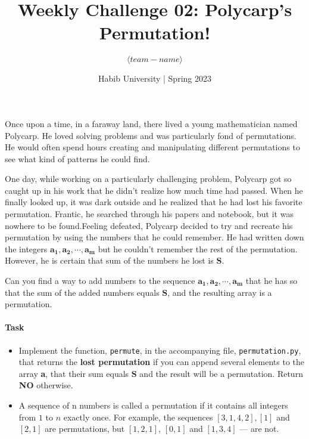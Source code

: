 \documentclass[a4paper]{exam}
\title{Weekly Challenge 02: Polycarp's Permutation!}
\author{$\langle team-name \rangle$}  %
\date{Habib University | Spring 2023}
\begin{document}
\maketitle

\begin{questions}

    Once upon a time, in a faraway land, there lived a young mathematician named Polycarp.
    He loved solving problems and was particularly fond of permutations. He would often
    spend hours creating and manipulating different permutations to see what kind of
    patterns he could find.

    One day, while working on a particularly challenging problem, Polycarp got so caught up
    in his work that he didn't realize how much time had passed. When he finally looked up,
    it was dark outside and he realized that he had lost his favorite permutation. Frantic,
    he searched through his papers and notebook, but it was nowhere to be found.Feeling
    defeated, Polycarp decided to try and recreate his permutation by using the numbers
    that he could remember. He had written down the integers $\mathbf{a_1, a_2, \cdots , a_m}$
    but he couldn't remember the rest of the permutation.  However, he is certain that
    sum of the numbers he lost is $\mathbf{S}$.

    Can you find a way to add numbers to the sequence $\mathbf{a_1,a_2,\cdots, a_m}$ that he has
    so that the sum of the added numbers equals $\mathbf{S}$, and the resulting array is a permutation.




    \paragraph{Task}
    \begin{itemize}
        \item Implement the function, \texttt{permute}, in the accompanying file,  \texttt{permutation.py},
              that returns the \textbf{lost permutation} if you can append several elements to the array \textbf{a},
              that their sum equals $\mathbf{S}$ and the result will be a permutation. Return \textbf{NO} otherwise.

        \item A sequence of n numbers is called a permutation if it contains all integers from $1$ to $n$
              exactly once. For example, the sequences $[3,1,4,2], [1]$  and $[2,1]$ are permutations, but $[1,2,1]$,
              $[0,1]$ and $[1,3,4]$ — are not.


\end{itemize}
\end{questions}
\end{document}

